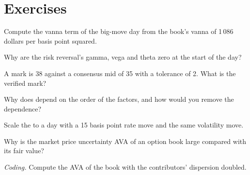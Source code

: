 \section{Exercises}

\begin{exercise}[$\star$]\label{exo:rc:pnl-explain-and-independent-price-verification:1}
Compute the vanna term of the big-move day from the book's vanna of 1\,086 dollars per basis point squared.
\end{exercise}

\begin{exercise}[$\star$]\label{exo:rc:pnl-explain-and-independent-price-verification:2}
Why are the risk reversal's gamma, vega and theta zero at the start of the day?
\end{exercise}

\begin{exercise}[$\star$]\label{exo:rc:pnl-explain-and-independent-price-verification:3}
A mark is 38 against a consensus mid of 35 with a tolerance of 2. What is the verified mark?
\end{exercise}

\begin{exercise}[$\star\star$]\label{exo:rc:pnl-explain-and-independent-price-verification:4}
Why does  depend on the order of the factors, and how would you remove the
dependence?
\end{exercise}

\begin{exercise}[$\star\star$]\label{exo:rc:pnl-explain-and-independent-price-verification:5}
Scale the  to a day with a 15 basis point rate move and the same volatility move.
\end{exercise}

\begin{exercise}[$\star\star$]\label{exo:rc:pnl-explain-and-independent-price-verification:6}
Why is the market price uncertainty AVA of an option book large compared with its fair value?
\end{exercise}

\begin{exercise}[$\star\star\star$]\label{exo:rc:pnl-explain-and-independent-price-verification:7}
\emph{Coding.} Compute the AVA of the book with the contributors' dispersion doubled.
\end{exercise}

